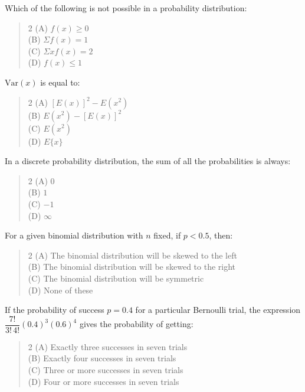\documentclass[11pt,a4paper]{article}
\begin{document}
\begin{mcqlist}
\item Which of the following is not possible in a probability distribution:
\begin{quote}\begin{multicols}{2}
\noindent (A) $f(x)\geq 0$ \\
(B) $\Sigma f(x)=1$ \\
(C) $\Sigma xf(x)=2$ \\
(D) $f(x)\leq 1$
\end{multicols}\end{quote}

\item $\mathrm{Var}(x)$ is equal to:
\begin{quote}\begin{multicols}{2}
\noindent (A) $[E(x)]^2-E(x^2)$ \\
(B) $E(x^2)-[E(x)]^2$ \\
(C) $E(x^2)$ \\
(D) $E\{x\}$
\end{multicols}\end{quote}

\item In a discrete probability distribution, the sum of all the probabilities is always:
\begin{quote}\begin{multicols}{2}
\noindent (A) $0$ \\
(B) $1$ \\
(C) $-1$ \\
(D) $\infty$
\end{multicols}\end{quote}

\item For a given binomial distribution with $n$ fixed, if $p<0.5$, then:
\begin{quote}\begin{multicols}{2}
\noindent (A) The binomial distribution will be skewed to the left \\
(B) The binomial distribution will be skewed to the right \\
(C) The binomial distribution will be symmetric \\
(D) None of these
\end{multicols}\end{quote}

\item If the probability of success $p=0.4$ for a particular Bernoulli trial, the expression $\dfrac{7!}{3!\,4!}(0.4)^3(0.6)^4$ gives the probability of getting:
\begin{quote}\begin{multicols}{2}
\noindent (A) Exactly three successes in seven trials \\
(B) Exactly four successes in seven trials \\
(C) Three or more successes in seven trials \\
(D) Four or more successes in seven trials
\end{multicols}\end{quote}


\end{mcqlist}
\end{document}

